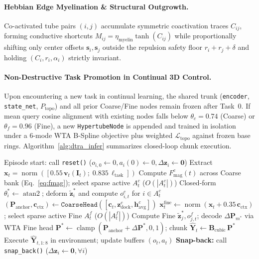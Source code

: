 \documentclass[10pt,twocolumn]{article}
\begin{document}
\paragraph{Hebbian Edge Myelination \& Structural Outgrowth.}
Co-activated tube pairs $(i,j)$ accumulate symmetric coactivation traces $C_{ij}$, forming conductive shortcuts $M_{ij} = \eta_{\text{myelin}}\tanh(C_{ij})$ while proportionally shifting only center offsets $\mathbf{s}_i, \mathbf{s}_j$ outside the repulsion safety floor $r_i+r_j+\delta$ and holding $(C_i, r_i, \alpha_i)$ strictly invariant.

\paragraph{Non-Destructive Task Promotion in Continual 3D Control.}
Upon encountering a new task in continual learning, the shared trunk (\texttt{encoder}, \texttt{state\_net}, $P_{\text{topo}}$) and all prior Coarse/Fine nodes remain frozen after Task~0. If mean query cosine alignment with existing nodes falls below $\theta_c=0.74$ (Coarse) or $\theta_f=0.96$ (Fine), a new \texttt{HypertubeNode} is appended and trained in isolation under a $6$-mode WTA B-Spline objective plus weighted $\mathcal{L}_{\text{topo}}$ against frozen base rings. Algorithm~\ref{alg:dtra_infer} summarizes closed-loop chunk execution.

\begin{algorithm}[t]
\caption{DTRA \texorpdfstring{$O(1)$}{O(1)} Closed-Loop Inference \& Snap-Back}
\label{alg:dtra_infer}
\begin{algorithmic}[1]
\Require Episode start: call \texttt{reset()} ($o_{i,0} \leftarrow 0, a_i(0) \leftarrow 0, \Delta\mathbf{z}_i \leftarrow \mathbf{0}$)
  \State Extract $\mathbf{x}_t = \operatorname{norm}([0.55\,\mathbf{v}_t(\mathbf{I}_t);\; 0.835\,\boldsymbol{\ell}_{\text{task}}])$
  \State Compute $F_{\text{mag}}^c(t)$ across Coarse bank (Eq.~\ref{eq:fmag}); select sparse active $A_t^c$ ($O(|A_t^c|)$)
  \State Closed-form $\theta_i^* \leftarrow \operatorname{atan2}$; deform $\tilde{\mathbf{z}}_i^*$ and compute $o_{i,t}^c$ for $i \in A_t^c$
  \State $(\mathbf{P}_{\text{anchor}}, \mathbf{c}_{\text{ctx}}) \leftarrow \texttt{CoarseHead}([\mathbf{c}_t, \mathbf{z}_{\text{dock}}^c, \mathbf{h}_{\text{avg}}^c])$
  \State $\mathbf{x}_t^{\text{fine}} \leftarrow \operatorname{norm}(\mathbf{x}_t + 0.35\,\mathbf{c}_{\text{ctx}})$; select sparse active Fine $A_t^f$ ($O(|A_t^f|)$)
  \State Compute Fine $\tilde{\mathbf{z}}_j^*, o_{j,t}^f$; decode $\Delta\mathbf{P}_{m^*}$ via WTA Fine head
  \State $\mathbf{P}^* \leftarrow \operatorname{clamp}(\mathbf{P}_{\text{anchor}} + \Delta\mathbf{P}^*, 0, 1)$; chunk $\hat{\mathbf{Y}}_t \leftarrow \mathbf{B}_{\text{cubic}}\,\mathbf{P}^*$
  \State Execute $\hat{\mathbf{Y}}_{t, 1:8}$ in environment; update buffers $(o_{t}, a_{t})$
  \State \textbf{Snap-back:} call \texttt{snap\_back()} ($\Delta\mathbf{z}_i \leftarrow \mathbf{0}, \forall i$)
\EndFor
\end{algorithmic}
\end{algorithm}
\end{document}
